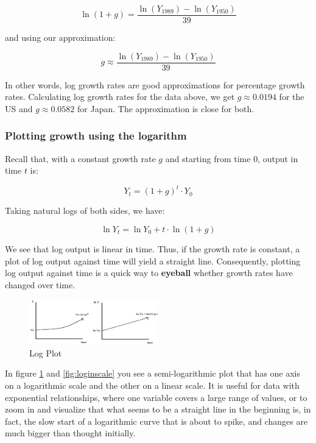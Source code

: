 \documentclass[
  12pt,
  oneside]{book}
\theoremstyle{definition}
\theoremstyle{definition}
\theoremstyle{definition}
\theoremstyle{definition}
\theoremstyle{remark}
\begin{document}
\[
\ln (1 + g) = \frac{\ln (Y_{1989}) - \ln (Y_{1950})}{39}
\]

and using our approximation:

\[
g \approx \frac{\ln (Y_{1989}) - \ln (Y_{1950})}{39}
\]

In other words, log growth rates are good approximations for percentage growth rates. Calculating log growth rates for the data above, we get \(g \approx 0.0194\) for the US and \(g \approx 0.0582\) for Japan. The approximation is close for both.

\subsubsection*{Plotting growth using the logarithm}\label{plotting-growth-using-the-logarithm}

Recall that, with a constant growth rate \(g\) and starting from time 0, output in time \(t\) is:

\[Y_t = (1 + g)^t \cdot Y_0\]

Taking natural logs of both sides, we have:

\[\ln Y_t = \ln Y_0 + t \cdot \ln (1 + g)\]

We see that log output is linear in time. Thus, if the growth rate is constant, a plot of log output against time will yield a straight line. Consequently, plotting log output against time is a quick way to \textbf{eyeball} whether growth rates have changed over time.

\begin{figure}
\centering
\includegraphics[width=0.5\textwidth,height=\textheight]{fig/logplot.png}
\caption{\label{fig:logplot} Log Plot}
\end{figure}

In figure \ref{fig:logplot} and \ref{fig:loginscale} you see a semi-logarithmic plot that has one axis on a logarithmic scale and the other on a linear scale. It is useful for data with exponential relationships, where one variable covers a large range of values, or to zoom in and visualize that what seems to be a straight line in the beginning is, in fact, the slow start of a logarithmic curve that is about to spike, and changes are much bigger than thought initially.
\end{document}
